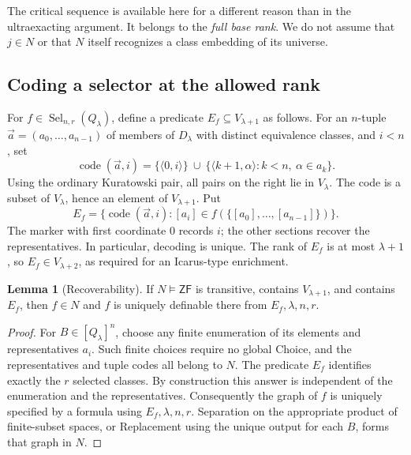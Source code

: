 \documentclass[11pt,letterpaper]{article}
\theoremstyle{definition}
\newtheorem{lemma}[definition]{Lemma}
\newcommand{\ZF}{\mathsf{ZF}}
\newcommand{\Sel}{\operatorname{Sel}}
\newcommand{\Code}{\operatorname{code}}
\begin{document}
The critical sequence is available here for a different reason than in the ultraexacting argument. It belongs to the \emph{full base rank}. We do not assume that $j\in N$ or that $N$ itself recognizes a class embedding of its universe.

\subsection{Coding a selector at the allowed rank}

For $f\in\Sel_{n,r}(Q_\lambda)$, define a predicate $E_f\subseteq V_{\lambda+1}$ as follows. For an $n$-tuple $\vec a=(a_0,\ldots,a_{n-1})$ of members of $D_\lambda$ with distinct equivalence classes, and $i<n$, set
\begin{equation}\label{eq:code}
 \Code(\vec a,i)=
 \{\langle0,i\rangle\}\ \cup\
 \{\langle k+1,\alpha\rangle:k<n,\ \alpha\in a_k\}.
\end{equation}
Using the ordinary Kuratowski pair, all pairs on the right lie in $V_\lambda$. The code is a subset of $V_\lambda$, hence an element of $V_{\lambda+1}$. Put
\begin{equation}\label{eq:ef}
 E_f=\{\Code(\vec a,i):[a_i]\in f(\{[a_0],\ldots,[a_{n-1}]\})\}.
\end{equation}
The marker with first coordinate $0$ records $i$; the other sections recover the representatives. In particular, decoding is unique. The rank of $E_f$ is at most $\lambda+1$, so $E_f\in V_{\lambda+2}$, as required for an Icarus-type enrichment.

\begin{lemma}[Recoverability]\label{lem:decode}
If $N\models\ZF$ is transitive, contains $V_{\lambda+1}$, and contains $E_f$, then $f\in N$ and $f$ is uniquely definable there from $E_f,\lambda,n,r$.
\end{lemma}

\begin{proof}
For $B\in[Q_\lambda]^n$, choose any finite enumeration of its elements and representatives $a_i$. Such finite choices require no global Choice, and the representatives and tuple codes all belong to $N$. The predicate $E_f$ identifies exactly the $r$ selected classes. By construction this answer is independent of the enumeration and the representatives. Consequently the graph of $f$ is uniquely specified by a formula using $E_f,\lambda,n,r$. Separation on the appropriate product of finite-subset spaces, or Replacement using the unique output for each $B$, forms that graph in $N$.
\end{proof}
\end{document}
